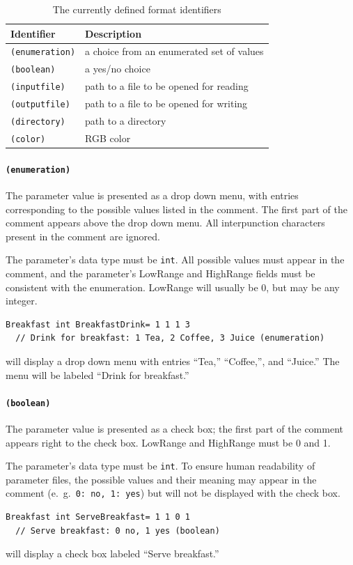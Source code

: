 \documentclass[letterpaper,oneside,12pt]{book}
\begin{document}
\begin{table}[ht]
 \centering
 \begin{tabular}{|l|l|}
  \hline
  \textbf{Identifier} & \textbf{Description}\\
  \hline
  \texttt{(enumeration)} & a choice from an enumerated set of values \\
  \texttt{(boolean)} & a yes/no choice \\
  \texttt{(inputfile)} & path to a file to be opened for reading \\
  \texttt{(outputfile)} & path to a file to be opened for writing \\
  \texttt{(directory)} & path to a directory \\
  \texttt{(color)} & RGB color \\
  \hline
 \end{tabular}
 \caption{The currently defined format identifiers}
\end{table}   

\paragraph{\texttt{(enumeration)}}
The parameter value is presented as a drop down menu, with entries corresponding to the
possible values listed in the comment. The first part of the comment appears above
the drop down menu. All interpunction characters present in the comment are ignored.

The parameter's data type must be \texttt{int}.
All possible values must appear in the comment, and the parameter's LowRange and HighRange 
fields must be consistent with the enumeration. LowRange will usually be 0, but may be any
integer.
\begin{verbatim}
Breakfast int BreakfastDrink= 1 1 1 3
  // Drink for breakfast: 1 Tea, 2 Coffee, 3 Juice (enumeration)
\end{verbatim}
will display a drop down menu with entries ``Tea,'' ``Coffee,'', and ``Juice.''
The menu will be labeled ``Drink for breakfast.''

\paragraph{\texttt{(boolean)}}
The parameter value is presented as a check box; the first part of the comment appears
right to the check box. LowRange and HighRange must be 0 and 1.

The parameter's data type must be \texttt{int}.
To ensure human readability of parameter files, the possible values and their meaning may 
appear in the comment (e.\ g.\ \texttt{0:\ no, 1:\ yes}) but will not be displayed with the 
check box.
\begin{verbatim}
Breakfast int ServeBreakfast= 1 1 0 1
  // Serve breakfast: 0 no, 1 yes (boolean)
\end{verbatim}
will display a check box labeled ``Serve breakfast.''
\end{document}
